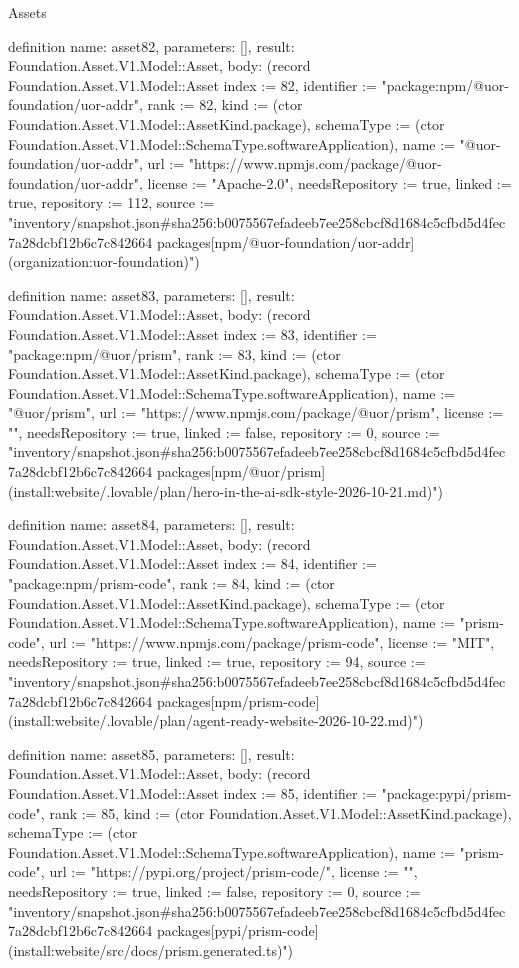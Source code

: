 \begin{lexlean}{Assets}
\begin{semanticmodule}
definition{
  name: asset82,
  parameters: [],
  result: Foundation.Asset.V1.Model::Asset,
  body: (record Foundation.Asset.V1.Model::Asset {index := 82, identifier := "package:npm/@uor-foundation/uor-addr", rank := 82, kind := (ctor Foundation.Asset.V1.Model::AssetKind.package), schemaType := (ctor Foundation.Asset.V1.Model::SchemaType.softwareApplication), name := "@uor-foundation/uor-addr", url := "https://www.npmjs.com/package/@uor-foundation/uor-addr", license := "Apache-2.0", needsRepository := true, linked := true, repository := 112, source := "inventory/snapshot.json#sha256:b0075567efadeeb7ee258cbcf8d1684c5cfbd5d4fec7a28dcbf12b6c7c842664 packages[npm/@uor-foundation/uor-addr] (organization:uor-foundation)"})
}

definition{
  name: asset83,
  parameters: [],
  result: Foundation.Asset.V1.Model::Asset,
  body: (record Foundation.Asset.V1.Model::Asset {index := 83, identifier := "package:npm/@uor/prism", rank := 83, kind := (ctor Foundation.Asset.V1.Model::AssetKind.package), schemaType := (ctor Foundation.Asset.V1.Model::SchemaType.softwareApplication), name := "@uor/prism", url := "https://www.npmjs.com/package/@uor/prism", license := "", needsRepository := true, linked := false, repository := 0, source := "inventory/snapshot.json#sha256:b0075567efadeeb7ee258cbcf8d1684c5cfbd5d4fec7a28dcbf12b6c7c842664 packages[npm/@uor/prism] (install:website/.lovable/plan/hero-in-the-ai-sdk-style-2026-10-21.md)"})
}

definition{
  name: asset84,
  parameters: [],
  result: Foundation.Asset.V1.Model::Asset,
  body: (record Foundation.Asset.V1.Model::Asset {index := 84, identifier := "package:npm/prism-code", rank := 84, kind := (ctor Foundation.Asset.V1.Model::AssetKind.package), schemaType := (ctor Foundation.Asset.V1.Model::SchemaType.softwareApplication), name := "prism-code", url := "https://www.npmjs.com/package/prism-code", license := "MIT", needsRepository := true, linked := true, repository := 94, source := "inventory/snapshot.json#sha256:b0075567efadeeb7ee258cbcf8d1684c5cfbd5d4fec7a28dcbf12b6c7c842664 packages[npm/prism-code] (install:website/.lovable/plan/agent-ready-website-2026-10-22.md)"})
}

definition{
  name: asset85,
  parameters: [],
  result: Foundation.Asset.V1.Model::Asset,
  body: (record Foundation.Asset.V1.Model::Asset {index := 85, identifier := "package:pypi/prism-code", rank := 85, kind := (ctor Foundation.Asset.V1.Model::AssetKind.package), schemaType := (ctor Foundation.Asset.V1.Model::SchemaType.softwareApplication), name := "prism-code", url := "https://pypi.org/project/prism-code/", license := "", needsRepository := true, linked := false, repository := 0, source := "inventory/snapshot.json#sha256:b0075567efadeeb7ee258cbcf8d1684c5cfbd5d4fec7a28dcbf12b6c7c842664 packages[pypi/prism-code] (install:website/src/docs/prism.generated.ts)"})
}


\end{semanticmodule}
\end{lexlean}
